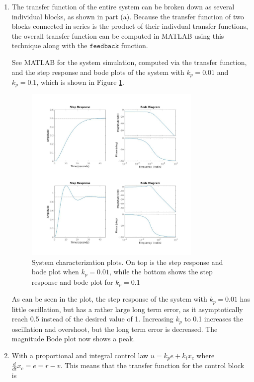 \documentclass[11pt]{article}
\theoremstyle{definition}
\begin{document}
\begin{enumerate}
\begin{enumerate}
        \item %
        The transfer function of the entire system can be broken down as several individual blocks, as shown in part (a).  Because the transfer function of two blocks connected in series is the product of their indivdual transfer functions, the overall transfer function can be computed in MATLAB using this technique along with the $\mathtt{feedback}$ function.  

        See MATLAB for the system simulation, computed via the transfer function, and the step response and bode plots of the system with $k_p = 0.01$ and $k_p = 0.1$, which is shown in Figure \ref{fig:plots_b}.

        \begin{figure}
            \centering
            \includegraphics[width = 0.8\textwidth]{155P6_2b.jpg}
            \caption{System characterization plots.  On top is the step response and bode plot when $k_p = 0.01$, while the bottom shows the step response and bode plot for $k_p = 0.1$}
            \label{fig:plots_b}
        \end{figure}

        As can be seen in the plot, the step response of the system with $k_p = 0.01$ has little oscillation, but has a rather large long term error, as it asymptotically reach 0.5 instead of the desired value of 1.  Increasing $k_p$ to 0.1 increases the oscillation and overshoot, but the long term error is decreased.  The magnitude Bode plot now shows a peak.  

        \item %
        With a proportional and integral control law $u = k_p e + k_i x_c$ where $\frac{d}{dt}x_c = e = r - v$.  This means that the transfer function for the control block is 


\end{enumerate}
\end{enumerate}
\end{document}
